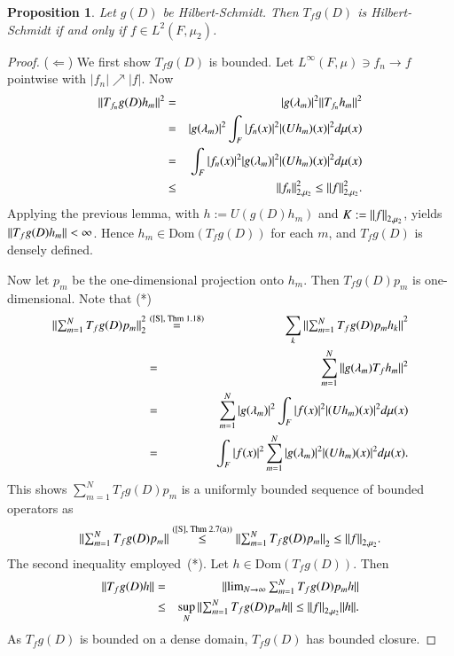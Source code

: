 \documentclass[final,1p]{elsarticle}
\numberwithin{equation}{section}
\theoremstyle{plain}
\newtheorem{prop}[thm]{Proposition}
\theoremstyle{definition}
\newcounter{prop2count}
\begin{document}
\begin{prop} \label{prop:2.1}
Let $g(D)$ be Hilbert-Schmidt.  Then $T_f g(D)$ is Hilbert-Schmidt if and only if $f \in L^2(F,\mu_2)$. 
\end{prop}
\begin{proof}
($\Leftarrow$) 
We first show $T_f g(D)$ is bounded.  Let $L^\infty(F,\mu) \ni f_n \to f$ pointwise with $|f_n| \nearrow |f|$.  Now
\begin{eqnarray*}
{\mbox{\ensuremath{\| {T_{f_n}g(D)h_m} \|}}}^2
& = & |g(\lambda_m)|^2 {\mbox{\ensuremath{\| {T_{f_n}h_m} \|}}}^2 \\
& = & |g(\lambda_m)|^2 \int_F |f_n(x)|^2|(Uh_m)(x)|^2 d\mu(x) \\
& = & \int_F |f_n(x)|^2 |g(\lambda_m)|^2 |(Uh_m)(x)|^2 d\mu(x) \\
& \leq & {\mbox{\ensuremath{\| {f_n} \|}}}^2_{2,\mu_2} \leq {\mbox{\ensuremath{\| {f} \|}}}^2_{2,\mu_2} .
\end{eqnarray*}
Applying the previous lemma, with $h := U(g(D)h_m)$ and $K := {\mbox{\ensuremath{\| {f} \|}}}_{2,\mu_2}$, yields ${\mbox{\ensuremath{\| {T_fg(D)h_m} \|}}} < \infty$.  Hence $h_m \in \text{Dom}(T_fg(D))$ for each $m$,
and $T_fg(D)$ is densely defined.

\medskip Now let $p_m$ be the one-dimensional projection onto $h_m$. 
Then $T_fg(D)p_m$ is one-dimensional.  Note that (*)
\begin{eqnarray*}
{\mbox{\ensuremath{\| {\sum_{m=1}^N T_fg(D)p_m} \|}}}_2^2
& \stackrel{\text{(\cite{S}, Thm 1.18)}}{=} & \sum_k {\mbox{\ensuremath{\| {\sum_{m=1}^N T_fg(D)p_m h_k} \|}}}^2 \\
& = & \sum_{m=1}^N {\mbox{\ensuremath{\| {g(\lambda_m) T_fh_m} \|}}}^2 \\
& = & \sum_{m=1}^N |g(\lambda_m)|^2 \int_F |f(x)|^2 |(Uh_m)(x)|^2 d\mu(x) \\
& = & \int_F |f(x)|^2 \sum_{m=1}^N |g(\lambda_m)|^2 |(Uh_m)(x)|^2 d\mu(x) .
\end{eqnarray*}
This shows $\sum_{m=1}^N T_fg(D)p_m$ is a uniformly bounded sequence of bounded operators as
$$
{\mbox{\ensuremath{\| {\sum_{m=1}^N T_fg(D)p_m} \|}}} \stackrel{\text{(\cite{S},  Thm  2.7(a))}}{\leq}  {\mbox{\ensuremath{\| {\sum_{m=1}^N T_fg(D)p_m} \|}}}_2 \leq {\mbox{\ensuremath{\| {f} \|}}}_{2,\mu_2} .
$$
The second inequality employed~(*). Let $h \in \text{Dom}(T_fg(D))$.  Then
\begin{eqnarray*}
{\mbox{\ensuremath{\| {T_fg(D)h} \|}}} & = & {\mbox{\ensuremath{\| {\lim_{N \to \infty}
\sum_{m=1}^N T_fg(D)p_m h} \|}}} \\
& \leq & \sup_N {\mbox{\ensuremath{\| { \sum_{m=1}^N T_f g(D)p_m h} \|}}} \leq {\mbox{\ensuremath{\| {f} \|}}}_{2,\mu_2} {\mbox{\ensuremath{\| {h} \|}}} .
\end{eqnarray*}
As $T_f g(D)$ is bounded on a dense domain,
$T_fg(D)$ has bounded closure.


\end{proof}
\end{document}
